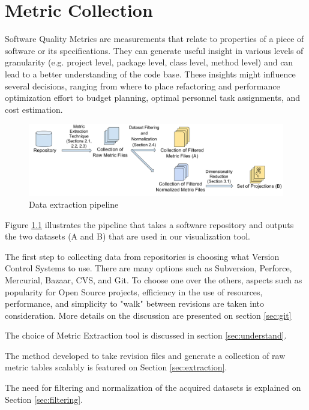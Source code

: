 \chapter{Metric Collection} \label{sec:metrics}

Software Quality Metrics are measurements that relate to properties of a piece of software or its specifications. They can generate useful insight in various levels of granularity (e.g. project level, package level, class level, method level) and can lead to a better understanding of the code base. These insights might influence several decisions, ranging from where to place refactoring and performance optimization effort to budget planning, optimal personnel task assignments, and cost estimation.

\begin{figure}[H]
	\centering
	\includegraphics[width=\textwidth]{figures/pipeline.png}
	\caption{Data extraction pipeline}
	\label{fig:data_pipeline}
\end{figure}

Figure \ref{fig:data_pipeline} illustrates the pipeline that takes a software repository and outputs the two datasets (A and B) that are used in our visualization tool.

The first step to collecting data from repositories is choosing what Version Control Systems to use. There are many options such as Subversion, Perforce, Mercurial, Bazaar, CVS, and Git. To choose one over the others, aspects such as popularity for Open Source projects, efficiency in the use of resources, performance, and simplicity to "walk" between revisions are taken into consideration. More details on the discussion are presented on section \ref{sec:git}

The choice of Metric Extraction tool is discussed in section \ref{sec:understand}.

The method developed to take revision files and generate a collection of raw metric tables scalably is featured on Section \ref{sec:extraction}.

The need for filtering and normalization of the acquired datasets is explained on Section \ref{sec:filtering}.

